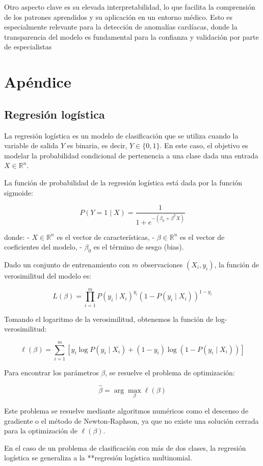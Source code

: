 \documentclass[titlepage,a4paper]{article}
\begin{document}
Otro aspecto clave es su elevada interpretabilidad, lo que facilita la comprensión de los patrones aprendidos y su aplicación en un entorno médico. Esto es especialmente relevante para la detección de anomalías cardíacas, donde la transparencia del modelo es fundamental para la confianza y validación por parte de especialistas
\section{Apéndice}
\subsection{Regresión logística}
La regresión logística es un modelo de clasificación que se utiliza cuando la variable de salida \( Y \) es binaria, es decir, \( Y \in \{0,1\} \). En este caso, el objetivo es modelar la probabilidad condicional de pertenencia a una clase dada una entrada \( X \in \mathbb{R}^n \).

La función de probabilidad de la regresión logística está dada por la función sigmoide:

\[
P(Y=1 \mid X) = \frac{1}{1 + e^{-(\beta_0 + \beta^T X)}}
\]

donde:
- \( X \in \mathbb{R}^n \) es el vector de características,
- \( \beta \in \mathbb{R}^n \) es el vector de coeficientes del modelo,
- \( \beta_0 \) es el término de sesgo (bias).

Dado un conjunto de entrenamiento con \( m \) observaciones \( (X_i, y_i) \), la función de verosimilitud del modelo es:

\[
L(\beta) = \prod_{i=1}^{m} P(y_i \mid X_i)^{y_i} (1 - P(y_i \mid X_i))^{1 - y_i}
\]

Tomando el logaritmo de la verosimilitud, obtenemos la función de log-verosimilitud:

\[
\ell(\beta) = \sum_{i=1}^{m} \left[ y_i \log P(y_i \mid X_i) + (1 - y_i) \log (1 - P(y_i \mid X_i)) \right]
\]

Para encontrar los parámetros \( \beta \), se resuelve el problema de optimización:

\[
\hat{\beta} = \arg\max_{\beta} \ell(\beta)
\]

Este problema se resuelve mediante algoritmos numéricos como el descenso de gradiente o el método de Newton-Raphson, ya que no existe una solución cerrada para la optimización de \( \ell(\beta) \).

En el caso de un problema de clasificación con más de dos clases, la regresión logística se generaliza a la **regresión logística multinomial.
\end{document}
